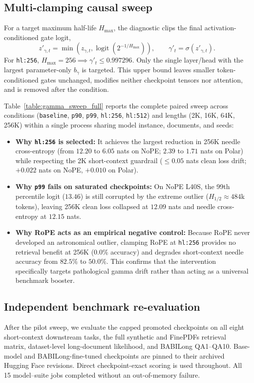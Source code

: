 \subsection{Multi-clamping causal sweep}
For a target maximum half-life $H_{\max}$, the diagnostic clips the final activation-conditioned gate logit,
\begin{equation}
 z'_{\gamma,t}=\min\!\left(z_{\gamma,t},\operatorname{logit}(2^{-1/H_{\max}})\right),\qquad
 \gamma'_t=\sigma(z'_{\gamma,t}).
\end{equation}
For \texttt{hl:256}, $H_{\max}=256 \implies \gamma'_t\leq0.997296$. Only the single layer/head with the largest parameter-only $b_\gamma$ is targeted. This upper bound leaves smaller token-conditioned gates unchanged, modifies neither checkpoint tensors nor attention, and is removed after the condition.

Table~\ref{table:gamma_sweep_full} reports the complete paired sweep across conditions (\texttt{baseline}, \texttt{p90}, \texttt{p99}, \texttt{hl:256}, \texttt{hl:512}) and lengths (2K, 16K, 64K, 256K) within a single process sharing model instance, documents, and seeds:
\begin{itemize}
  \item \textbf{Why \texttt{hl:256} is selected:} It achieves the largest reduction in 256K needle cross-entropy (from $12.20$ to $6.05$ nats on NoPE; $2.39$ to $1.71$ nats on Polar) while respecting the 2K short-context guardrail ($\le 0.05$ nats clean loss drift; $+0.022$ nats on NoPE, $+0.010$ on Polar).
  \item \textbf{Why \texttt{p99} fails on saturated checkpoints:} On NoPE L40S, the 99th percentile logit ($13.46$) is still corrupted by the extreme outlier ($H_{1/2} \approx 484$k tokens), leaving 256K clean loss collapsed at $12.09$ nats and needle cross-entropy at $12.15$ nats.
  \item \textbf{Why RoPE acts as an empirical negative control:} Because RoPE never developed an astronomical outlier, clamping RoPE at \texttt{hl:256} provides no retrieval benefit at 256K ($0.0\%$ accuracy) and degrades short-context needle accuracy from $82.5\%$ to $50.0\%$. This confirms that the intervention specifically targets pathological gamma drift rather than acting as a universal benchmark booster.
\end{itemize}

\subsection{Independent benchmark re-evaluation}
After the pilot sweep, we evaluate the capped promoted checkpoints on all eight short-context downstream tasks, the full synthetic and FinePDFs retrieval matrix, dataset-level long-document likelihood, and BABILong QA1--QA10. Base-model and BABILong-fine-tuned checkpoints are pinned to their archived Hugging Face revisions. Direct checkpoint-exact scoring is used throughout. All 15 model--suite jobs completed without an out-of-memory failure.

